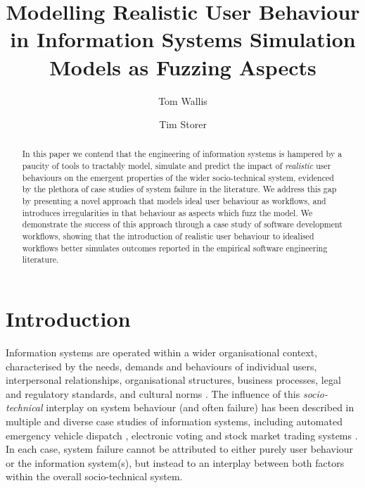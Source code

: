 \documentclass{llncs}
\title{Modelling Realistic User Behaviour in Information Systems Simulation Models as Fuzzing Aspects}
\author{Tom Wallis\orcidID{} \and Tim Storer\orcidID{}}
\institute{University of Glasgow, Glasgow, Scotland.\\
  \email{w.wallis.1@research.gla.ac.uk}\\
  \email{timothy.storer@glasgow.ac.uk}
}
\begin{document}

\maketitle


\begin{abstract}
  In this paper we contend that the engineering of information systems is hampered by a paucity of tools to tractably
  model, simulate and predict the impact of \emph{realistic} user behaviours on the emergent properties of the wider
  socio-technical system, evidenced by the plethora of case studies of system failure in the literature.  We address
  this gap by presenting a novel approach that models ideal user behaviour as workflows, and introduces irregularities
  in that behaviour as aspects which fuzz the model. We demonstrate the success of this approach through a case study of
  software development workflows, showing that the introduction of realistic user behaviour to idealised workflows
  better simulates outcomes reported in the empirical software engineering literature.
\end{abstract}


\section{Introduction}
\label{sec:introduction}


Information systems are operated within a wider organisational context, characterised by the needs, demands and
behaviours of individual users, interpersonal relationships, organisational structures, business processes, legal and
regulatory standards, and cultural norms \citep{bade07structures,pentland05organisational}.  The influence of this
\emph{socio-technical} interplay on system behaviour (and often failure) has been described in multiple and diverse case
studies of information systems, including automated emergency vehicle dispatch \citep{robinson96limited}, electronic
voting \citep{lock07observations} and stock market trading systems \citep{cftc-sec10findings}. In each case, system
failure cannot be attributed to either purely user behaviour or the information system(s), but instead to an interplay
between both factors within the overall socio-technical system.
\end{document}

